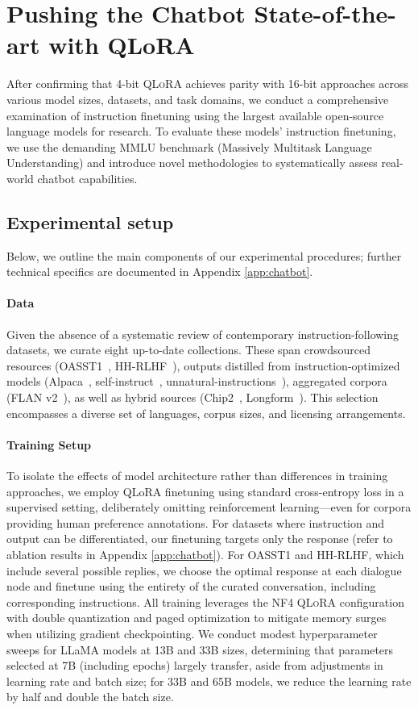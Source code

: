 \section{Pushing the Chatbot State-of-the-art with QLoRA}
\label{sec:pushing}
After confirming that 4-bit \textsc{QLoRA} achieves parity with 16-bit approaches across various model sizes, datasets, and task domains, we conduct a comprehensive examination of instruction finetuning using the largest available open-source language models for research. To evaluate these models' instruction finetuning, we use the demanding MMLU benchmark (Massively Multitask Language Understanding) and introduce novel methodologies to systematically assess real-world chatbot capabilities.

\subsection{Experimental setup}
Below, we outline the main components of our experimental procedures; further technical specifics are documented in Appendix \ref{app:chatbot}.

\paragraph{Data} Given the absence of a systematic review of contemporary instruction-following datasets, we curate eight up-to-date collections. These span crowdsourced resources (OASST1~\citep{kopf2023openassistant}, HH-RLHF~\citep{bai2022training}), outputs distilled from instruction-optimized models (Alpaca~\citep{alpaca}, self-instruct~\citep{wang2022self}, unnatural-instructions~\citep{honovich2022unnatural}), aggregated corpora (FLAN v2~\citep{chung2022scaling}), as well as hybrid sources (Chip2~\citep{laion2023}, Longform~\citep{koksal2023longform}). This selection encompasses a diverse set of languages, corpus sizes, and licensing arrangements.

\paragraph{Training Setup} To isolate the effects of model architecture rather than differences in training approaches, we employ QLoRA finetuning using standard cross-entropy loss in a supervised setting, deliberately omitting reinforcement learning—even for corpora providing human preference annotations. For datasets where instruction and output can be differentiated, our finetuning targets only the response (refer to ablation results in Appendix \ref{app:chatbot}). For OASST1 and HH-RLHF, which include several possible replies, we choose the optimal response at each dialogue node and finetune using the entirety of the curated conversation, including corresponding instructions. All training leverages the NF4 \textsc{QLoRA} configuration with double quantization and paged optimization to mitigate memory surges when utilizing gradient checkpointing. We conduct modest hyperparameter sweeps for LLaMA models at 13B and 33B sizes, determining that parameters selected at 7B (including epochs) largely transfer, aside from adjustments in learning rate and batch size; for 33B and 65B models, we reduce the learning rate by half and double the batch size.

